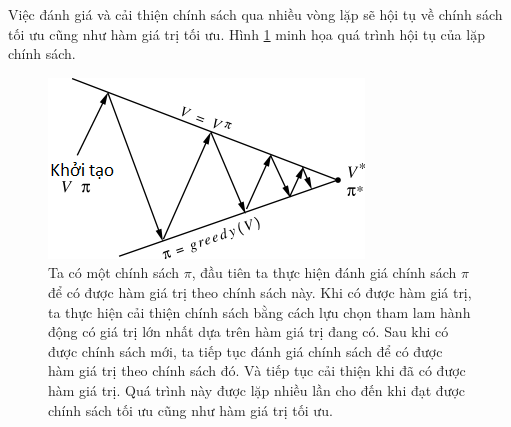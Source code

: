 Việc đánh giá và cải thiện chính sách qua nhiều vòng lặp sẽ hội tụ về chính sách tối ưu cũng như hàm giá trị tối ưu. Hình \ref{fig:policy_iteration_MDP} minh họa quá trình hội tụ của lặp chính sách.
\begin{figure}
	\centering
	\includegraphics[width=.8\textwidth]{policy_iteration}
	\caption[Hội tụ của quy trình tìm kiếm chính sách tối ưu]{Ta có một chính sách $\pi$, đầu tiên ta thực hiện đánh giá chính sách $\pi$ để có được hàm giá trị theo chính sách này. Khi có được hàm giá trị, ta thực hiện cải thiện chính sách bằng cách lựu chọn tham lam hành động có giá trị lớn nhất dựa trên hàm giá trị đang có. Sau khi có được chính sách mới, ta tiếp tục đánh giá chính sách để có được hàm giá trị theo chính sách đó. Và tiếp tục cải thiện khi đã có được hàm giá trị. Quá trình này được lặp nhiều lần cho đến khi đạt được chính sách tối ưu cũng như hàm giá trị tối ưu.}
	\label{fig:policy_iteration_MDP}	
\end{figure}


